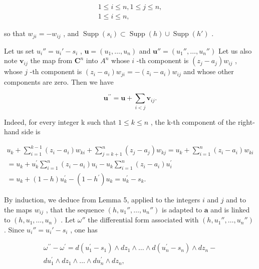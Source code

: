 \[
\begin{array}{l} 1 \leqslant i \leqslant n, 1 \leqslant j \leqslant n, \\ 1 \leqslant i \leqslant n, \end{array}
\]

so that \(w_{ji} = -w_{ij}\) , and \(\operatorname{Supp}(s_i) \subset \operatorname{Supp}(h) \cup \operatorname{Supp}(h')\) .

Let us set \(u_i'' = u_i' - s_i\) , \(\boldsymbol{u} = (u_1, \ldots, u_n)\) and \(\boldsymbol{u}'' = (u_1'', \ldots, u_n'')\) Let us also note \(\boldsymbol{v}_{ij}\) the map from \(\mathbf{C}^n\) into \(A^n\) whose \(i\) -th component is \((z_j - a_j) w_{ij}\) , whose \(j\) -th component is \((z_i - a_i) w_{ji} = -(z_i - a_i) w_{ij}\) and whose other components are zero. Then we have

\[
\boldsymbol {u} ^ {\prime \prime} = \boldsymbol {u} + \sum_ {i <   j} \boldsymbol {v} _ {i j}.
\]

Indeed, for every integer k such that \(1 \leqslant k \leqslant n\) , the k-th component of the right-hand side is

\[
\begin{array}{c} u _ {k} + \sum_ {i = 1} ^ {k - 1} (z _ {i} - a _ {i}) w _ {k i} + \sum_ {j = k + 1} ^ {n} (z _ {j} - a _ {j}) w _ {k j} = u _ {k} + \sum_ {i = 1} ^ {n} (z _ {i} - a _ {i}) w _ {k i} \\ = u _ {k} + u _ {k} ^ {\prime} \sum_ {i = 1} ^ {n} (z _ {i} - a _ {i}) u _ {i} - u _ {k} \sum_ {i = 1} ^ {n} (z _ {i} - a _ {i}) u _ {i} ^ {\prime} \\ = u _ {k} + (1 - h) u _ {k} ^ {\prime} - (1 - h ^ {\prime}) u _ {k} = u _ {k} ^ {\prime} - s _ {k}. \end{array}
\]

By induction, we deduce from Lemma 5, applied to the integers \(i\) and \(j\) and to the maps \(w_{ij}\) , that the sequence \((h,u_1'',\ldots,u_n'')\) is adapted to \(\boldsymbol{a}\) and is linked to \((h,u_1,\ldots,u_n)\) . Let \(\omega''\) the differential form associated with \((h,u_1'',\ldots,u_n'')\) . Since \(u_i'' = u_i' - s_i\) , one has

\[
\begin{array}{r} \omega^ {\prime \prime} - \omega^ {\prime} = d (u _ {1} ^ {\prime} - s _ {1}) \wedge d z _ {1} \wedge \dots \wedge d (u _ {n} ^ {\prime} - s _ {n}) \wedge d z _ {n} - \\ d u _ {1} ^ {\prime} \wedge d z _ {1} \wedge \dots \wedge d u _ {n} ^ {\prime} \wedge d z _ {n}, \end{array}
\]

